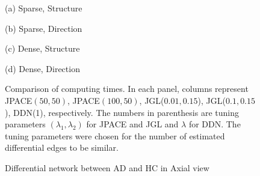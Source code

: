 \documentclass[useAMS,usenatbib,referee]{bio}
\begin{document}
{\begin{figure}[htb!] %
\begin{center} \medskip
\begin{minipage}[b]{.48\linewidth}
  \centering   \centerline{}
  \centerline{(a) Sparse, Structure}
\end{minipage} \medskip
\begin{minipage}[b]{.48\linewidth}
  \centering   \centerline{}
  \centerline{(b) Sparse, Direction }
\end{minipage}
\medskip
\begin{minipage}[b]{.48\linewidth}
  \centering   \centerline{}
  \centerline{(c) Dense, Structure}
\end{minipage}
\begin{minipage}[b]{.48\linewidth}
  \centering   \centerline{}
  \centerline{(d) Dense, Direction}
\end{minipage}
\caption{Comparison of computing times. In each panel, columns represent JPACE$(50,50)$, JPACE$(100,50)$, JGL($0.01,0.15$), JGL($0.1,0.15$), DDN(1),
respectively. The numbers in parenthesis are tuning parameters 
$(\lambda_1, \lambda_2)$ for JPACE and JGL and $\lambda$ for DDN. 
The tuning parameters were chosen for the number of estimated 
differential edges to be similar.}
\end{center}
\end{figure}



\begin{figure}[htb!]
 \begin{minipage}[c]{.45\linewidth}
  \centering
\centerline{}
\end{minipage}
 \begin{minipage}[c]{.45\linewidth}
  \centering
\centerline{}
\end{minipage}
  \caption{Differential network between AD and HC in Axial view}
\label{axial}
\end{figure}


\clearpage




}
\end{document}
